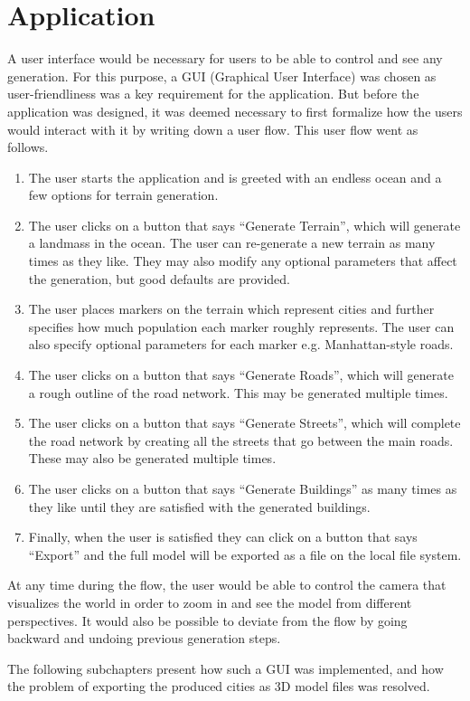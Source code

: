 \section{Application}

A user interface would be necessary for users to be able to control and see any generation. For this purpose, a GUI (Graphical User Interface) was chosen as user-friendliness was a key requirement for the application.
But before the application was designed, it was deemed necessary to first formalize how the users would interact with it by writing down a user flow.
This user flow went as follows.

\begin{enumerate}
\item The user starts the application and is greeted with an endless ocean and a few options for terrain generation.
\item The user clicks on a button that says “Generate Terrain”, which will generate a landmass in the ocean. The user can re-generate a new terrain as many times as they like. They may also modify any optional parameters that affect the generation, but good defaults are provided.
\item The user places markers on the terrain which represent cities and further specifies how much population each marker roughly represents. The user can also specify optional parameters for each marker e.g. Manhattan-style roads.
\item The user clicks on a button that says “Generate Roads”, which will generate a rough outline of the road network. This may be generated multiple times.
\item The user clicks on a button that says “Generate Streets”, which will complete the road network by creating all the streets that go between the main roads. These may also be generated multiple times.
\item The user clicks on a button that says “Generate Buildings” as many times as they like until they are satisfied with the generated buildings.
\item Finally, when the user is satisfied they can click on a button that says “Export” and the full model will be exported as a file on the local file system.
\end{enumerate}

At any time during the flow, the user would be able to control the camera that visualizes the world in order to zoom in and see the model from different perspectives.
It would also be possible to deviate from the flow by going backward and undoing previous generation steps.

The following subchapters present how such a GUI was implemented, and how the problem of exporting the produced cities as 3D model files was resolved.


